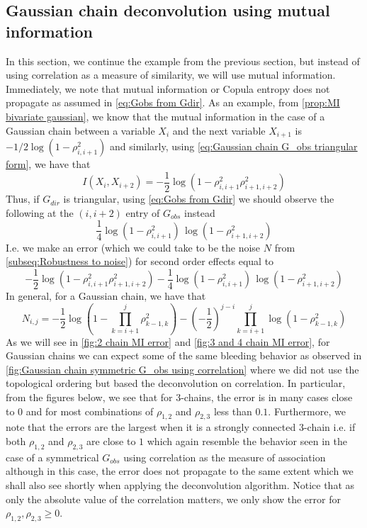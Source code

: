 \documentclass[../Thesis.tex]{subfiles}
\begin{document}
\subsection{Gaussian chain deconvolution using mutual information}
In this section, we continue the example from the previous section, but instead of using correlation as a measure of similarity, we will use mutual information. Immediately, we note that mutual information or Copula entropy does not propagate as assumed in \autoref{eq:Gobs from Gdir}. As an example, from \autoref{prop:MI bivariate gaussian}, we know that the mutual information in the case of a Gaussian chain between a variable $X_i$ and the next variable $X_{i+1}$ is $-1/2 \log\left(1 - \rho_{i,i+1}^2\right)$ and similarly, using \autoref{eq:Gaussian chain G_obs triangular form}, we have that
$$I\left(X_i, X_{i+2}\right) = -\frac{1}{2} \log \left(1 - \rho_{i,i+1}^2 \rho_{i+1,i+2}^2\right)$$
Thus, if $G_{dir}$ is triangular, using \autoref{eq:Gobs from Gdir} we should observe the following at the $(i,i+2)$ entry of $G_{obs}$ instead
$$\frac{1}{4} \log\left(1 - \rho_{i,i+1}^2\right)\,\log\left(1 - \rho_{i+1,i+2}^2\right)$$
I.e. we make an error (which we could take to be the noise $N$ from \autoref{subseq:Robustness to noise}) for second order effects equal to
$$-\frac{1}{2} \log \left(1 - \rho_{i,i+1}^2 \rho_{i+1,i+2}^2\right) - \frac{1}{4} \log\left(1 - \rho_{i,i+1}^2\right)\,\log\left(1 - \rho_{i+1,i+2}^2\right)$$
In general, for a Gaussian chain, we have that
$$N_{i,j} = -\frac{1}{2} \log\left( 1 - \prod_{k=i+1}^{j} \rho_{k-1,k}^2\right) - \left(-\frac{1}{2}\right)^{j-i}\prod_{k=i+1}^{j} \log\left(1 - \rho_{k-1,k}^2\right)$$
As we will see in \autoref{fig:2 chain MI error} and \autoref{fig:3 and 4 chain MI error}, for Gaussian chains we can expect some of the same bleeding behavior as observed in \autoref{fig:Gaussian chain symmetric G_obs using correlation} where we did not use the topological ordering but based the deconvolution on correlation. In particular, from the figures below, we see that for $3$-chains, the error is in many cases close to $0$ and for most combinations of $\rho_{1,2}$ and $\rho_{2,3}$ less than $0.1$. Furthermore, we note that the errors are the largest when it is a strongly connected $3$-chain i.e. if both $\rho_{1,2}$ and $\rho_{2,3}$ are close to $1$ which again resemble the behavior seen in the case of a symmetrical $G_{obs}$ using correlation as the measure of association although in this case, the error does not propagate to the same extent which we shall also see shortly when applying the deconvolution algorithm. Notice that as only the absolute value of the correlation matters, we only show the error for $\rho_{1,2}, \rho_{2,3} \geq 0$.
\end{document}
